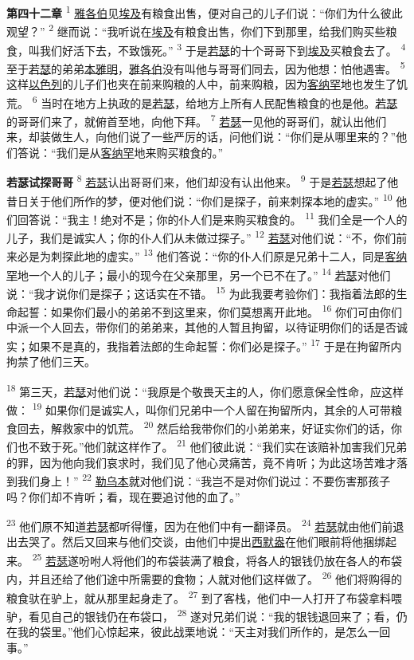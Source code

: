 \textbf{第四十二章\quad}
\textsuperscript{1}
\uline{雅各伯}见\uline{埃及}有粮食出售，便对自己的儿子们说：“你们为什么彼此观望？”
\textsuperscript{2}
继而说：“我听说在\uline{埃及}有粮食出售，你们下到那里，给我们购买些粮食，叫我们好活下去，不致饿死。”
\textsuperscript{3}
于是\uline{若瑟}的十个哥哥下到\uline{埃及}买粮食去了。
\textsuperscript{4}
至于\uline{若瑟}的弟弟\uline{本雅明}，\uline{雅各伯}没有叫他与哥哥们同去，因为他想：怕他遇害。
\textsuperscript{5}
这样\uline{以色列}的儿子们也夹在前来购粮的人中，前来购粮，因为\uline{客纳罕}地也发生了饥荒。
\textsuperscript{6}
当时在地方上执政的是\uline{若瑟}，给地方上所有人民配售粮食的也是他。\uline{若瑟}的哥哥们来了，就俯首至地，向他下拜。
\textsuperscript{7}
\uline{若瑟}一见他的哥哥们，就认出他们来，却装做生人，向他们说了一些严厉的话，问他们说：“你们是从哪里来的？”他们答说：“我们是从\uline{客纳罕}地来购买粮食的。”

\textbf{若瑟试探哥哥\quad}
\textsuperscript{8}
\uline{若瑟}认出哥哥们来，他们却没有认出他来。
\textsuperscript{9}
于是\uline{若瑟}想起了他昔日关于他们所作的梦，便对他们说：“你们是探子，前来刺探本地的虚实。”
\textsuperscript{10}
他们回答说：“我主！绝对不是；你的仆人们是来购买粮食的。
\textsuperscript{11}
我们全是一个人的儿子，我们是诚实人；你的仆人们从未做过探子。”
\textsuperscript{12}
\uline{若瑟}对他们说：“不，你们前来必是为刺探此地的虚实。”
\textsuperscript{13}
他们答说：“你的仆人们原是兄弟十二人，同是\uline{客纳罕}地一个人的儿子；最小的现今在父亲那里，另一个已不在了。”
\textsuperscript{14}
\uline{若瑟}对他们说：“我才说你们是探子；这话实在不错。
\textsuperscript{15}
为此我要考验你们：我指着法郎的生命起誓：如果你们最小的弟弟不到这里来，你们莫想离开此地。
\textsuperscript{16}
你们可由你们中派一个人回去，带你们的弟弟来，其他的人暂且拘留，以待证明你们的话是否诚实；如果不是真的，我指着法郎的生命起誓：你们必是探子。”
\textsuperscript{17}
于是在拘留所内拘禁了他们三天。

\textsuperscript{18}
第三天，\uline{若瑟}对他们说：“我原是个敬畏天主的人，你们愿意保全性命，应这样做：
\textsuperscript{19}
如果你们是诚实人，叫你们兄弟中一个人留在拘留所内，其余的人可带粮食回去，解救家中的饥荒。
\textsuperscript{20}
然后给我带你们的小弟弟来，好证实你们的话，你们也不致于死。”他们就这样作了。
\textsuperscript{21}
他们彼此说：“我们实在该赔补加害我们兄弟的罪，因为他向我们哀求时，我们见了他心灵痛苦，竟不肯听；为此这场苦难才落到我们身上！”
\textsuperscript{22}
\uline{勒乌本}就对他们说：“我岂不是对你们说过：不要伤害那孩子吗？你们却不肯听；看，现在要追讨他的血了。”

\textsuperscript{23}
他们原不知道\uline{若瑟}都听得懂，因为在他们中有一翻译员。
\textsuperscript{24}
\uline{若瑟}就由他们前退出去哭了。然后又回来与他们交谈，由他们中提出\uline{西默盎}在他们眼前将他捆绑起来。
\textsuperscript{25}
\uline{若瑟}遂吩咐人将他们的布袋装满了粮食，将各人的银钱仍放在各人的布袋内，并且还给了他们途中所需要的食物；人就对他们这样做了。
\textsuperscript{26}
他们将购得的粮食驮在驴上，就从那里起身走了。
\textsuperscript{27}
到了客栈，他们中一人打开了布袋拿料喂驴，看见自己的银钱仍在布袋口，
\textsuperscript{28}
遂对兄弟们说：“我的银钱退回来了；看，仍在我的袋里。”他们心惊起来，彼此战栗地说：“天主对我们所作的，是怎么一回事。”

